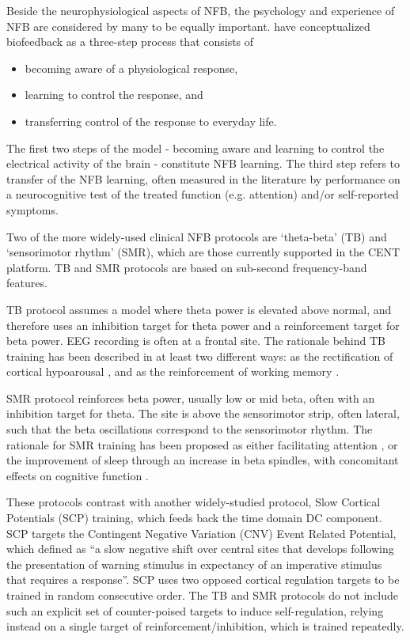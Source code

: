 \documentclass[fleqn,10pt]{wlpeerj}
\begin{document}
Beside the neurophysiological aspects of NFB, the psychology and experience of NFB are considered by many to be equally important. \cite{Calderon2004} have conceptualized biofeedback as a three-step process that consists of 

\begin{itemize}
	\item becoming aware of a physiological response, 
	\item learning to control the response, and 
	\item transferring control of the response to everyday life.
\end{itemize}

The first two steps of the model - becoming aware and learning to control the electrical activity of the brain - constitute NFB learning. The third step refers to transfer of the NFB learning, often measured in the literature by performance on a neurocognitive test of the treated function (e.g. attention) and/or self-reported symptoms.


Two of the more widely-used clinical NFB protocols are ‘theta-beta’ (TB) and ‘sensorimotor rhythm’ (SMR), which are those currently supported in the CENT platform. TB and SMR protocols are based on sub-second frequency-band features.

TB protocol assumes a model where theta power is elevated above normal, and therefore uses an inhibition target for theta power and a reinforcement target for beta power. EEG recording is often at a frontal site. The rationale behind TB training has been described in at least two different ways: as the rectification of cortical hypoarousal \citep{Barry2003}, and as the reinforcement of working memory \citep{Vernon2003}.

SMR protocol reinforces beta power, usually low or mid beta, often with an inhibition target for theta. The site is above the sensorimotor strip, often lateral, such that the beta oscillations correspond to the sensorimotor rhythm. The rationale for SMR training has been proposed as either facilitating attention \citep{Vernon2003}, or the improvement of sleep through an increase in beta spindles, with concomitant effects on cognitive function \citep{Arns2014}.

These protocols contrast with another widely-studied protocol, Slow Cortical Potentials (SCP) training, which feeds back the time domain DC component. SCP targets the Contingent Negative Variation (CNV) Event Related Potential, which \cite{Mayer2015} defined as “a slow negative shift over central sites that develops following the presentation of warning stimulus in expectancy of an imperative stimulus that requires a response”. SCP uses two opposed cortical regulation targets to be trained in random consecutive order. The TB and SMR protocols do not include such an explicit set of counter-poised targets to induce self-regulation, relying instead on a single target of reinforcement/inhibition, which is trained repeatedly.
\end{document}

